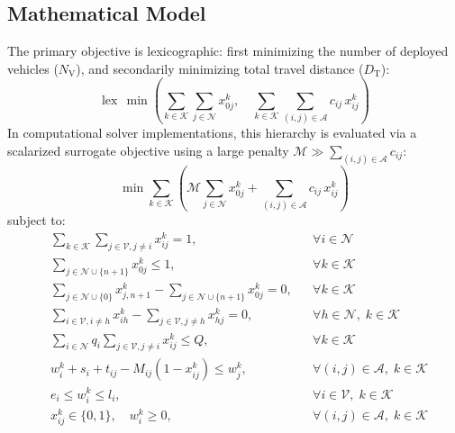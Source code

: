\documentclass{ieeeaccess}
\newcommand{\NV}{{N_\mathrm{V}}}
\newcommand{\TD}{{D_\mathrm{T}}}
\begin{document}
\subsection{Mathematical Model}
The primary objective is lexicographic: first minimizing the number of deployed vehicles ($\NV$), and secondarily minimizing total travel distance ($\TD$):
\begin{equation}
  \operatorname{lex}\,\min \left( \sum_{k \in \mathcal{K}} \sum_{j \in \mathcal{N}} x_{0j}^k, \quad \sum_{k \in \mathcal{K}} \sum_{(i,j) \in \mathcal{A}} c_{ij}\,x_{ij}^k \right)
  \label{eq:lexicographic_obj}
\end{equation}
In computational solver implementations, this hierarchy is evaluated via a scalarized surrogate objective using a large penalty $\mathcal{M} \gg \sum_{(i,j) \in \mathcal{A}} c_{ij}$:
\begin{equation}
  \min \sum_{k \in \mathcal{K}} \left( \mathcal{M} \sum_{j \in \mathcal{N}} x_{0j}^k + \sum_{(i,j) \in \mathcal{A}} c_{ij}\,x_{ij}^k \right)
  \label{eq:scalarized_obj}
\end{equation}
subject to:
\begin{align}
  &\sum_{k \in \mathcal{K}} \sum_{j \in \mathcal{V}, j \neq i} x_{ij}^k = 1, &&\forall i \in \mathcal{N} \label{eq:visit_once} \\
  &\sum_{j \in \mathcal{N} \cup \{n+1\}} x_{0j}^k \le 1, &&\forall k \in \mathcal{K} \label{eq:depot_outflow} \\
  &\sum_{j \in \mathcal{N} \cup \{0\}} x_{j, n+1}^k - \sum_{j \in \mathcal{N} \cup \{n+1\}} x_{0j}^k = 0, &&\forall k \in \mathcal{K} \label{eq:depot_inflow} \\
  &\sum_{i \in \mathcal{V}, i \neq h} x_{ih}^k - \sum_{j \in \mathcal{V}, j \neq h} x_{hj}^k = 0, &&\forall h \in \mathcal{N}, \; k \in \mathcal{K} \label{eq:flow_conservation} \\
  &\sum_{i \in \mathcal{N}} q_i \sum_{j \in \mathcal{V}, j \neq i} x_{ij}^k \le Q, &&\forall k \in \mathcal{K} \label{eq:capacity_constraint} \\
  &w_i^k + s_i + t_{ij} - M_{ij} (1 - x_{ij}^k) \le w_j^k, &&\forall (i, j) \in \mathcal{A}, \; k \in \mathcal{K} \label{eq:time_propagation} \\
  &e_i \le w_i^k \le l_i, &&\forall i \in \mathcal{V}, \; k \in \mathcal{K} \label{eq:time_window_bound} \\
  &x_{ij}^k \in \{0, 1\}, \quad w_i^k \ge 0, &&\forall (i, j) \in \mathcal{A}, \; k \in \mathcal{K} \label{eq:variable_domains}
\end{align}
\end{document}
